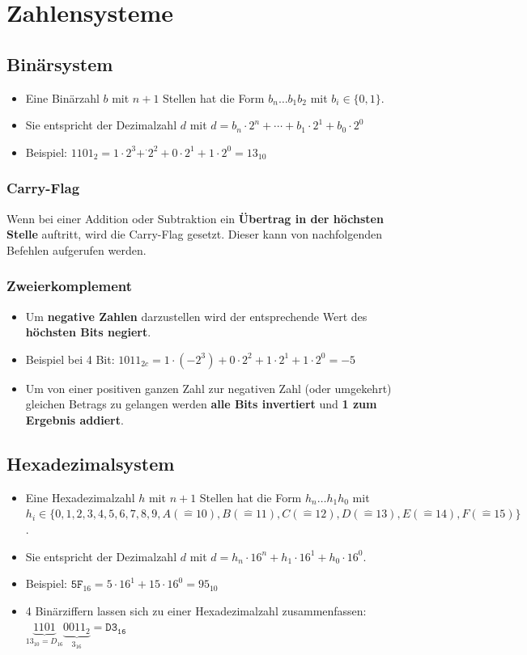 \documentclass[12pt]{article}
\begin{document}
\section{Zahlensysteme}
\subsection{Binärsystem}
\begin{itemize}[leftmargin=*]
    \item[] Eine Binärzahl $b$ mit $n + 1$ Stellen hat die Form $b_n\dots b_1 b_2$ mit $b_i \in \{0,1\}$.
    \item[] Sie entspricht der Dezimalzahl $d$ mit $d = b_n \cdot 2^n + \cdots + b_1 \cdot 2^1 + b_0 \cdot 2^0$ 
    \item[] Beispiel: $1101_2 = 1 \cdot 2^3 + ^\cdot 2^2 + 0 \cdot 2^1 + 1 \cdot 2^0 = 13_{10}$
\end{itemize}
\subsubsection{Carry-Flag}
Wenn bei einer Addition oder Subtraktion ein \textbf{Übertrag in der höchsten Stelle} auftritt, wird die Carry-Flag gesetzt.
Dieser kann von nachfolgenden Befehlen aufgerufen werden.
\subsubsection{Zweierkomplement}
\begin{itemize}[leftmargin=*]
    \item[] Um \textbf{negative Zahlen} darzustellen wird der entsprechende Wert des \textbf{höchsten Bits negiert}.
    \item[] Beispiel bei 4 Bit: $1011_{2c} = 1 \cdot (-2^3) + 0 \cdot 2^2 + 1 \cdot 2^1 + 1 \cdot 2^0 = -5$
    \item[] Um von einer positiven ganzen Zahl zur negativen Zahl (oder umgekehrt) gleichen Betrags zu gelangen werden \textbf{alle Bits invertiert} und \textbf{1 zum Ergebnis addiert}.
\end{itemize}

\subsection{Hexadezimalsystem}
\begin{itemize}[leftmargin=*]
    \item[] Eine Hexadezimalzahl $h$ mit $n + 1$ Stellen hat die Form $h_n \dots h_1 h_0$ mit $h_i \in \{0, 1, 2, 3, 4, 5, 6, 7, 8, 9, A(\widehat{=}10), B(\widehat{=}11), C(\widehat{=}12), D(\widehat{=}13), E(\widehat{=}14), F(\widehat{=}15)\}$.
    \item[] Sie entspricht der Dezimalzahl $d$ mit $d = h_n \cdot 16^n + h_1 \cdot 16^1 + h_0 \cdot 16^0$.
    \item[] Beispiel: $\mathtt{5F}_{16} = 5 \cdot 16^1 + 15 \cdot 16^0 = 95_{10}$
    \item[] 4 Binärziffern lassen sich zu einer Hexadezimalzahl zusammenfassen:\\$\underbrace{1101}_{13_{10}=D_{16}} \underbrace{0011_2}_{3_{16}} = \mathtt{D3_{16}}$
\end{itemize}
\end{document}
